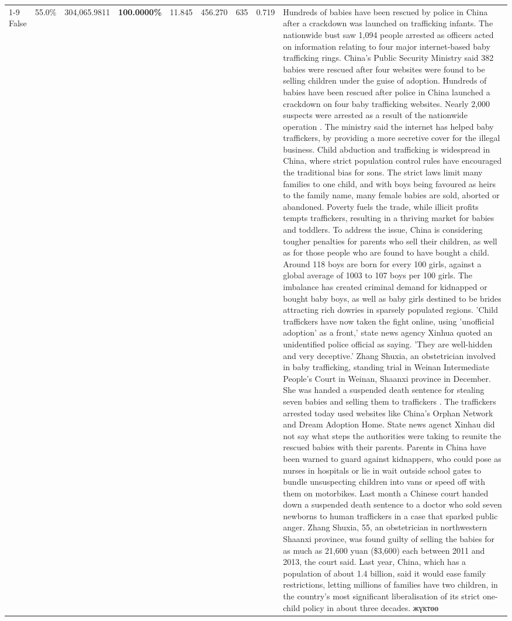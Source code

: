 \begin{table}[H]
\begin{tabular}{lllrlllll}
\cline{1-9}
False & 55.0\% & 304,065.9811 & \bfseries \color{red} 100.0000\% & 11.845 & 456.270 & 635 & 0.719 & Hundreds of babies have been rescued by police in China after a crackdown was launched on trafficking infants. The nationwide bust saw 1,094 people arrested as officers acted on information relating to four major internet-based baby trafficking rings. China's Public Security Ministry said 382 babies were rescued after four websites were found to be selling children under the guise of adoption. Hundreds of babies have been rescued after police in China launched a crackdown on four baby trafficking websites. Nearly 2,000 suspects were arrested as a result of the nationwide operation . The ministry said the internet has helped baby traffickers, by providing a more secretive cover for the illegal business. Child abduction and trafficking is widespread in China, where strict population control rules have encouraged the traditional bias for sons. The strict laws limit many families to one child, and with boys being favoured as heirs to the family name, many female babies are sold, aborted or abandoned. Poverty fuels the trade, while illicit profits tempts traffickers, resulting in a thriving market for babies and toddlers. To address the issue, China is considering tougher penalties for parents who sell their children, as well as for those people who are found to have bought a child. Around 118 boys are born for every 100 girls, against a global average of 1003 to 107 boys per 100 girls. The imbalance has created criminal demand for kidnapped or bought baby boys, as well as baby girls destined to be brides attracting rich dowries in sparsely populated regions. 'Child traffickers have now taken the fight online, using 'unofficial adoption' as a front,' state news agency Xinhua quoted an unidentified police official as saying. 'They are well-hidden and very deceptive.' Zhang Shuxia, an obstetrician involved in baby trafficking, standing trial in Weinan Intermediate People's Court in Weinan, Shaanxi province in December. She was handed a suspended death sentence for stealing seven babies and selling them to traffickers . The traffickers arrested today used websites like China's Orphan Network and Dream Adoption Home. State news agenct Xinhau did not say what steps the authorities were taking to reunite the rescued babies with their parents. Parents in China have been warned to guard against kidnappers, who could pose as nurses in hospitals or lie in wait outside school gates to bundle unsuspecting children into vans or speed off with them on motorbikes. Last month a Chinese court handed down a suspended death sentence to a doctor who sold seven newborns to human traffickers in a case that sparked public anger. Zhang Shuxia, 55, an obstetrician in northwestern Shaanxi province, was found guilty of selling the babies for as much as 21,600 yuan (\$3,600) each between 2011 and 2013, the court said. Last year, China, which has a population of about 1.4 billion, said it would ease family restrictions, letting millions of families have two children, in the country's most significant liberalisation of its strict one-child policy in about three decades. жүктөө \\

\end{tabular}
\end{table}
